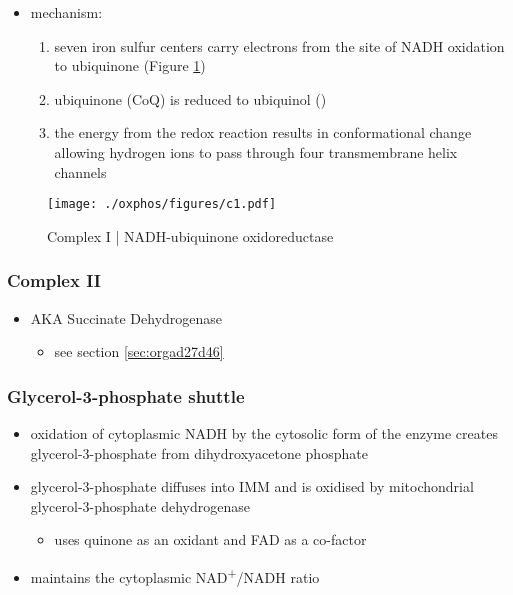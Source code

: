 \documentclass[12pt]{scrartcl}
\begin{document}
{\small{}}

\begin{itemize}
\item mechanism: 
\begin{enumerate}
\item seven iron sulfur centers carry electrons from the site of NADH
oxidation to ubiquinone (Figure \ref{fig:orgb1c80d6})
\item ubiquinone (CoQ) is reduced to ubiquinol ()
\item the energy from the redox reaction results in conformational
change allowing hydrogen ions to pass through four transmembrane
helix channels
\end{enumerate}
\end{itemize}

\begin{figure}[htbp]
\centering
\texttt{[image: ./oxphos/figures/c1.pdf]}
\caption[c1]{\label{fig:orgb1c80d6}Complex I | NADH-ubiquinone oxidoreductase}
\end{figure}

\subsubsection{Complex II}
\label{sec:org0064809}
\begin{itemize}
\item AKA Succinate Dehydrogenase 
\begin{itemize}
\item see section \ref{sec:orgad27d46}
\end{itemize}
\end{itemize}

\subsubsection{Glycerol-3-phosphate shuttle}
\label{sec:org99b73f0}
\begin{itemize}
\item oxidation of cytoplasmic NADH by the cytosolic form of the enzyme
creates glycerol-3-phosphate from dihydroxyacetone phosphate
\item glycerol-3-phosphate diffuses into IMM and is oxidised by mitochondrial glycerol-3-phosphate dehydrogenase
\begin{itemize}
\item uses quinone as an oxidant and FAD as a co-factor
\end{itemize}
\item maintains the cytoplasmic NAD\textsuperscript{+}/NADH ratio
\end{itemize}
\end{document}
